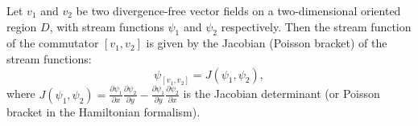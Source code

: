 Let $v_1$ and $v_2$ be two divergence-free vector fields on a two-dimensional oriented region $D$, with stream functions $\psi_1$ and $\psi_2$ respectively. Then the stream function of the commutator $[v_1, v_2]$ is given by the Jacobian (Poisson bracket) of the stream functions:
$$\psi_{[v_1, v_2]} = J(\psi_1, \psi_2),$$
where $J(\psi_1, \psi_2) = \frac{\partial \psi_1}{\partial x} \frac{\partial \psi_2}{\partial y} - \frac{\partial \psi_1}{\partial y} \frac{\partial \psi_2}{\partial x}$ is the Jacobian determinant (or Poisson bracket in the Hamiltonian formalism).
